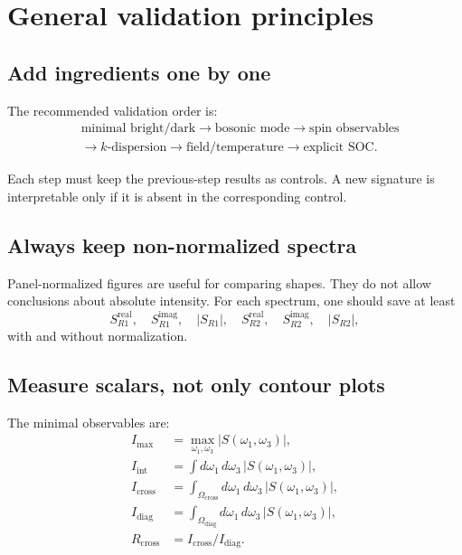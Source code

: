 \documentclass[11pt]{article}
\begin{document}
\section{General validation principles}

\subsection{Add ingredients one by one}

The recommended validation order is:
\begin{equation}
\begin{aligned}
&\text{minimal bright/dark}
\rightarrow
\text{bosonic mode}
\rightarrow
\text{spin observables}
\\
&\rightarrow
k\text{-dispersion}
\rightarrow
\text{field/temperature}
\rightarrow
\text{explicit SOC}.
\end{aligned}
\end{equation}

Each step must keep the previous-step results as controls. A new signature is interpretable only if it is absent in the corresponding control.

\subsection{Always keep non-normalized spectra}

Panel-normalized figures are useful for comparing shapes. They do not allow conclusions about absolute intensity. For each spectrum, one should save at least
\begin{equation}
S_{R1}^{\mathrm{real}},\quad
S_{R1}^{\mathrm{imag}},\quad
|S_{R1}|,\quad
S_{R2}^{\mathrm{real}},\quad
S_{R2}^{\mathrm{imag}},\quad
|S_{R2}|,
\end{equation}
with and without normalization.

\subsection{Measure scalars, not only contour plots}

The minimal observables are:
\begin{align}
I_{\max} &= \max_{\omega_1,\omega_3}|S(\omega_1,\omega_3)|,\\
I_{\mathrm{int}} &= \int d\omega_1\,d\omega_3\,|S(\omega_1,\omega_3)|,\\
I_{\mathrm{cross}} &= \int_{\Omega_{\mathrm{cross}}} d\omega_1\,d\omega_3\,|S(\omega_1,\omega_3)|,\\
I_{\mathrm{diag}} &= \int_{\Omega_{\mathrm{diag}}} d\omega_1\,d\omega_3\,|S(\omega_1,\omega_3)|,\\
R_{\mathrm{cross}} &= I_{\mathrm{cross}}/I_{\mathrm{diag}}.
\end{align}
\end{document}
